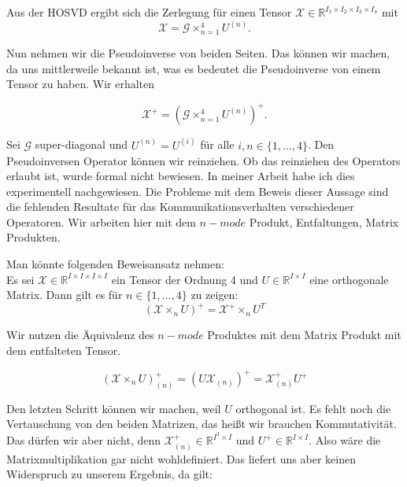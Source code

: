 Aus der HOSVD ergibt sich die Zerlegung für einen Tensor $\pmb{\mathscr{X}}  \in \mathbb{R}^{I_1 \times I_2 \times I_3 \times I_4}$  mit
\begin{equation}
\pmb{\mathscr{X}} = \pmb{\mathscr{G}} \times_{n=1}^{4} U^{ (n) }.
\end{equation}

Nun nehmen wir die Pseudoinverse von beiden Seiten. Das können wir machen, da uns mittlerweile bekannt ist, was es bedeutet die Pseudoinverse von einem Tensor zu haben. Wir erhalten

\begin{equation}
\pmb{\mathscr{X}}^{+} = (\pmb{\mathscr{G}} \times_{n=1}^{4} U^{ (n) })^+.
\end{equation}


Sei $\mathcal{G}$ super-diagonal und $U^{(n)}=U^{(i)}$ für alle $i,n \in \{1,\dots,4\}$. Den Pseudoinversen Operator können wir reinziehen. Ob das reinziehen des Operators erlaubt ist, wurde formal nicht bewiesen. In meiner Arbeit habe ich dies experimentell nachgewiesen. Die Probleme mit dem Beweis dieser Aussage sind die fehlenden Resultate für das Kommunikationsverhalten verschiedener Operatoren. Wir arbeiten hier mit dem $n-mode$ Produkt, Entfaltungen, Matrix Produkten. 

Man könnte folgenden Beweisansatz nehmen: \\
Es sei $\mathscr{X} \in \mathbb{R}^{I \times I \times I \times I}$ ein Tensor der Ordnung 4 und $U \in \mathbb{R}^{I \times I}$ eine orthogonale Matrix.
Dann gilt es für $n \in \{1,\dots,4\}$ zu zeigen:
\begin{equation*}
(\mathscr{X} \times_n U)^+ = \mathscr{X}^+ \times_n U^T 
\end{equation*} 

Wir nutzen die Äquivalenz des $n-mode$ Produktes mit dem Matrix Produkt mit dem entfalteten Tensor.

\begin{equation*}
(\mathscr{X} \times_n U)^+ _{(n)} = ( U \mathscr{X}_{(n)} )^+ = \mathscr{X}_{(n)}^+ U^+
\end{equation*}

Den letzten Schritt können wir machen, weil $U$ orthogonal ist.
Es fehlt noch die Vertauschung von den beiden Matrizen, das heißt wir brauchen Kommutativität.
Das dürfen wir aber nicht, denn $\mathscr{X}_{(n)}^+ \in \mathbb{R}^{I^3 \times I}$ und $U^+ \in \mathbb{R}^{I \times I}$. Also wäre die Matrixmultiplikation gar nicht wohldefiniert. Das liefert uns aber keinen Widerspruch zu unserem Ergebnis, da gilt:

